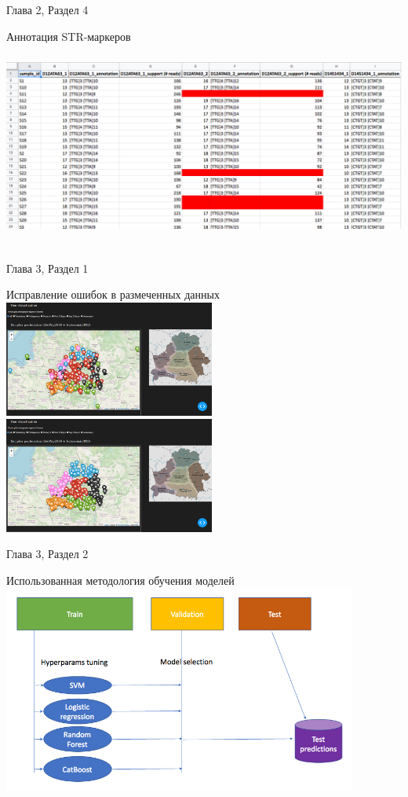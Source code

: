 \documentclass[8pt]{beamer}
\begin{document}
\begin{frame}{Глава 2, Раздел 4}
    \begin{block}{Аннотация STR-маркеров}
        \includegraphics[height=6.8cm]{images/ann.png}
        \centering
    \end{block}
\end{frame}

\begin{frame}{Глава 3, Раздел 1}
    \begin{block}{Исправление ошибок в размеченных данных}
        \includegraphics[height=3.8cm]{images/geomap_v1.png}
        \includegraphics[height=3.8cm]{images/geomap_v2.png}
        \centering
    \end{block}
\end{frame}

\begin{frame}{Глава 3, Раздел 2}
    \begin{block}{Использованная методология обучения моделей}
        \includegraphics[height=6.8cm]{images/ml_info.png}
        \centering
    \end{block}
\end{frame}
\end{document}
